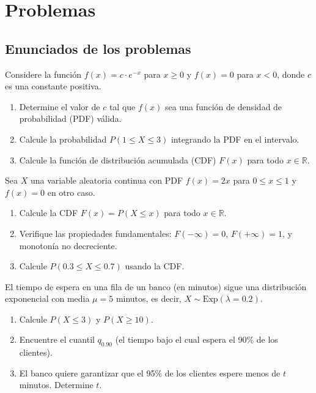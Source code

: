 \section*{Problemas}

\subsection*{Enunciados de los problemas}

\begin{problema}
	\label{prob:14b3125}
	Considere la función $f(x) = c \cdot e^{-x}$ para $x \ge 0$ y $f(x) = 0$ para $x < 0$, donde $c$ es una constante positiva.
	\begin{enumerate}
		\item Determine el valor de $c$ tal que $f(x)$ sea una función de densidad de probabilidad (PDF) válida.
		\item Calcule la probabilidad $P(1 \le X \le 3)$ integrando la PDF en el intervalo.
		\item Calcule la función de distribución acumulada (CDF) $F(x)$ para todo $x \in \mathbb{R}$.
	\end{enumerate}
\end{problema}

\begin{problema}
	\label{prob:287c45c}
	Sea $X$ una variable aleatoria continua con PDF $f(x) = 2x$ para $0 \le x \le 1$ y $f(x) = 0$ en otro caso.
	\begin{enumerate}
		\item Calcule la CDF $F(x) = P(X \le x)$ para todo $x \in \mathbb{R}$.
		\item Verifique las propiedades fundamentales: $F(-\infty) = 0$, $F(+\infty) = 1$, y monotonía no decreciente.
		\item Calcule $P(0.3 \le X \le 0.7)$ usando la CDF.
	\end{enumerate}
\end{problema}

\begin{problema}
	\label{prob:61a9dd8}
	El tiempo de espera en una fila de un banco (en minutos) sigue una distribución exponencial con media $\mu = 5$ minutos, es decir, $X \sim \text{Exp}(\lambda = 0.2)$.
	\begin{enumerate}
		\item Calcule $P(X \le 3)$ y $P(X \ge 10)$.
		\item Encuentre el cuantil $q_{0.90}$ (el tiempo bajo el cual espera el 90\% de los clientes).
		\item El banco quiere garantizar que el 95\% de los clientes espere menos de $t$ minutos. Determine $t$.
	\end{enumerate}
\end{problema}

